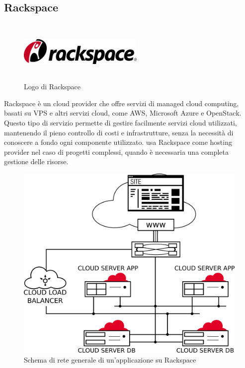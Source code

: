    \subsection{Rackspace}
   \begin{figure}[H]
      \begin{center}
         \includegraphics[width=6cm,height=3cm,keepaspectratio]{immagini/rackspace-logo}
      \end{center}
      \caption{Logo di Rackspace}\label{logorackspace}
   \end{figure}
   Rackspace è un cloud provider che offre servizi di managed cloud computing, basati su \gls{VPS} e altri servizi cloud, come \gls{AWS}, Microsoft Azure e OpenStack. Questo tipo di servizio permette di gestire facilmente servizi cloud utilizzati, mantenendo il pieno controllo di costi e infrastrutture, senza la necessità di conoscere a fondo ogni componente utilizzato. 
   \nomeAzienda{} usa Rackspace come hosting provider nel caso di progetti complessi, quando è necessaria una completa gestione delle risorse.
   \begin{figure}[H]
      \begin{center}
      \includegraphics[width=14cm,keepaspectratio]{immagini/rackspace-network}
      \end{center}
      \caption{Schema di rete generale di un'applicazione su Rackspace}
   \end{figure}


